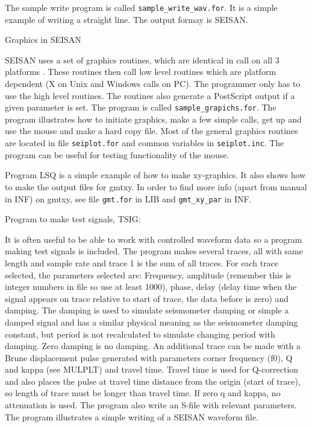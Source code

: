 The sample write program is called
\texttt{sample\_write\_wav.for}. It is a simple example 
of writing a straight line. The output formay is SEISAN.

Graphics in SEISAN 

SEISAN uses a set of graphics routines, which are identical in call 
on all 3 platforms . These routines then call low level routines 
which are platform dependent (X on Unix and Windows calls on PC). 
The programmer only has to use the high level routines. The routines 
also generate a PostScript output if a given parameter is set. 
The program is called \texttt{sample\_grapichs.for}. 
The program illustrates how to initiate graphics, make a few simple 
calls, get up and use the mouse and make a hard copy file. Most of 
the general graphics routines are located in file \texttt{seiplot.for} and 
common variables in \texttt{seiplot.inc}. The program can be 
useful for testing functionality of the mouse. 

Program LSQ is a simple example of how to make xy-graphics. It 
also shows how to make the output files for gmtxy. In order to find 
more info (apart from manual in INF) on gmtxy, see file 
\texttt{gmt.for} in LIB and \texttt{gmt\_xy\_par} 
in INF.  

Program to make test signals, TSIG:

It is often useful to be able to work with controlled waveform data 
so a program making test signals is included. The program makes 
several traces, all with same length and sample rate and trace 1 
is the sum of all traces. For each trace selected, the parameters 
selected are: Frequency, amplitude (remember this is integer numbers 
in file so use at least 1000), phase, delay (delay time when the 
signal appears on trace relative to start of trace, the data before 
is zero) and damping. The damping is used to simulate seismometer 
damping or simple a damped signal and has a similar physical meaning 
as the seismometer damping constant, but period is not recalculated 
to simulate changing period with damping. Zero damping is no damping. 
 \newline
An additional trace can be made with a Brune displacement pulse 
generated with parameters corner frequency (f0), Q and kappa (see 
MULPLT) and travel time. Travel time is used for Q-correction and 
also places the pulse at travel time distance from the origin (start 
of trace), so length of trace must be longer than travel time. If 
zero q and kappa, no attenuation is used. The program also write 
an S-file with relevant parameters. The program illustrates a 
simple writing of a SEISAN waveform file.  

